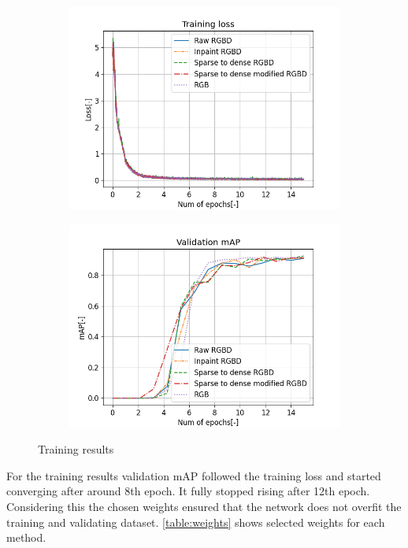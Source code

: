 \documentclass[twoside]{ctuthesis}
\theoremstyle{plain}
\theoremstyle{definition}
\theoremstyle{note}
\begin{document}
\begin{figure}
	\centering
	\begin{subfigure}[b]{0.49\textwidth}
		\centering
		\includegraphics[width=\textwidth]{train_loss.png}
	\end{subfigure}
	\hfill
	\begin{subfigure}[b]{0.49\textwidth}
		\centering
		\includegraphics[width=\textwidth]{validation_mAP.png}
	\end{subfigure}
	\caption{Training results}
\end{figure}
For the training results validation mAP followed the training loss and started converging after around 8th epoch. It fully stopped rising after 12th epoch. Considering this the chosen weights ensured that the network does not overfit the training and validating dataset. \autoref{table:weights} shows selected weights for each method.
\end{document}
